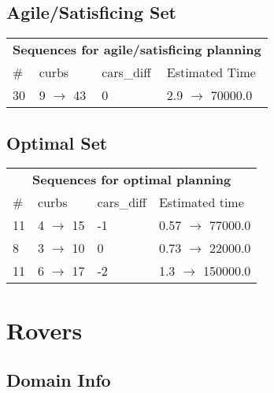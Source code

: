 \documentclass{article}
\begin{document}
                         \subsection*{Agile/Satisficing Set}

                        \begin{center}
                        \begin{tabular}{l|l|l|l}
                        \multicolumn{4}{c}{\bf \large Sequences for agile/satisficing planning}\\
                        \# & curbs & cars\_diff & Estimated Time\\\midrule
                        30&9 $\rightarrow$ 43&0&2.9 $\rightarrow$ 70000.0
                        \end{tabular}
                        \end{center}
                    
                            \subsection*{Optimal Set}

                            \begin{center}
                            \begin{tabular}{l|l|l|l}
                            \multicolumn{4}{c}{\bf \large Sequences for optimal planning}\\
                            \# & curbs & cars\_diff & Estimated time\\\midrule
                            11&4 $\rightarrow$ 15&-1&0.57 $\rightarrow$ 77000.0\\
8&3 $\rightarrow$ 10&0&0.73 $\rightarrow$ 22000.0\\
11&6 $\rightarrow$ 17&-2&1.3 $\rightarrow$ 150000.0
                            \end{tabular}
                            \end{center}
                    \newpage \section{Rovers}
                    \subsection*{Domain Info}
\end{document}
